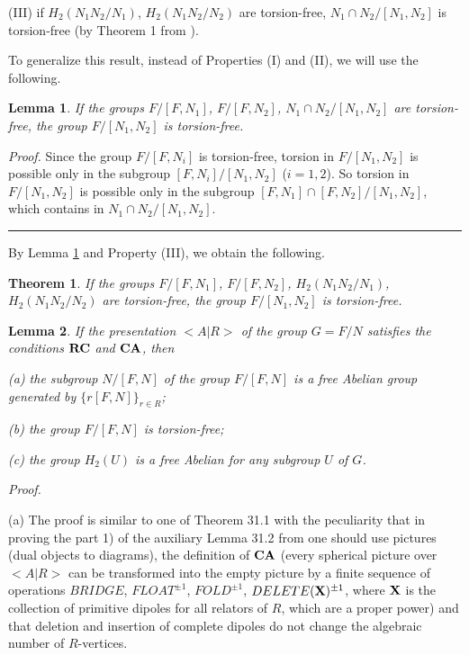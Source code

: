 \documentclass[12pt,reqno]{amsart}
\def\edvo{\rule {6pt}{6pt}}
\newtheorem{thm}{Theorem}
\newtheorem{lem}{Lemma}
\begin{document}
 (III) if $H_2(N_1N_2/N_1)$, $H_2(N_1N_2/N_2)$ are torsion-free, $N_1\cap N_2/[N_1,N_2]$ is torsion-free (by Theorem 1 from \cite{kuzmin2}).

To generalize this result, instead of Properties (I) and (II), we will use the following.

\begin{lem}\label{lem0_kruch3}
If the groups $F/[F,N_1]$, $F/[F,N_2]$, $N_1\cap N_2/[N_1,N_2]$ are torsion-free, the group $F/[N_1,N_2]$ is torsion-free.
 \end{lem}
{\it Proof.}
Since the group $F/[F,N_i]$ is torsion-free, torsion in $F/[N_1,N_2]$ is possible only in the subgroup $[F,N_i]/[N_1,N_2]$ ($i=1,2$). So torsion in $F/[N_1,N_2]$ is possible only in the subgroup $[F,N_1]\cap [F,N_2]/[N_1,N_2]$, which contains in $N_1\cap N_2/[N_1,N_2]$.
\edvo

By Lemma \ref{lem0_kruch3} and Property (III), we obtain the following.

\begin{thm}\label{kruch3}
If the groups $F/[F,N_1]$, $F/[F,N_2]$, $H_2(N_1N_2/N_1)$, $H_2(N_1N_2/N_2)$ are torsion-free, the group $F/[N_1,N_2]$ is torsion-free.
 \end{thm}

\begin{lem}\label{lem_kruch3}
If the presentation $<A|R>$ of the group $G=F/N$ satisfies the conditions $\bf RC$ and $\bf CA$, then

(a) the subgroup $N/[F,N]$ of the group $F/[F,N]$ is a free Abelian group generated by $\{r[F,N]\}_{r\in R}$;

(b) the group $F/[F,N]$ is torsion-free;

(c) the group $H_2(U)$ is a free Abelian for any subgroup $U$ of $G$.
 \end{lem}
{\it Proof.}

(a) The proof is similar to one of Theorem 31.1 \cite{olsh} with the peculiarity that in proving the part 1) of the auxiliary Lemma 31.2 from \cite{olsh} one should use pictures (dual objects to diagrams), the definition of $\bf CA$ (every spherical picture over $<A|R>$ can be transformed into the empty picture by a finite sequence of operations $BRIDGE$, $FLOAT^{\pm 1}$, $FOLD^{\pm 1}$, $DELETE({\bf X})^{\pm 1}$, where $\bf X$ is the collection of primitive dipoles for all relators of $R$, which are a proper power) and that deletion and insertion of complete dipoles do not change the algebraic number of $R$-vertices.
\end{document}
